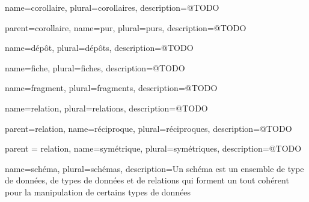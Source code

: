  {
	name=corollaire,
	plural=corollaires,
	description={@TODO}
}

	 {
		parent=corollaire,
		name=pur,
		plural=purs,
		description={@TODO}
	}
	
 {
	name=dépôt,
	plural=dépôts,
	description={@TODO}
}

 {
	name=fiche,
	plural=fiches,
	description={@TODO}
}

 {
	name=fragment,
	plural=fragments,
	description={@TODO}
}

 {
	name=relation,
	plural=relations,
	description={@TODO}
}

	 {
		parent=relation,
		name=réciproque,
		plural=réciproques,
		description={@TODO}
	}

	 {
		parent = relation,
		name=symétrique,
		plural=symétriques,
		description={@TODO}
	}

 {
	name=schéma,
	plural=schémas,
	description={Un schéma est un ensemble de type de données, de types de données et de relations qui forment un tout cohérent pour la manipulation de certains types de données}
}

\glsaddall[]